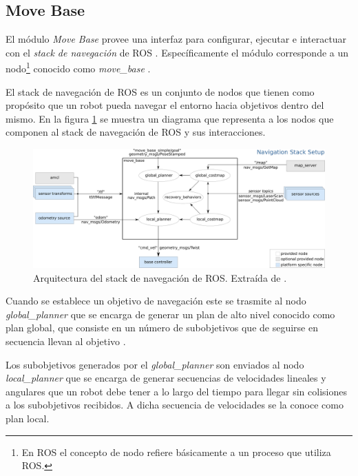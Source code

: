 \subsection{Move Base}\label{subsec:move_base}
El módulo \emph{Move Base} provee una interfaz para configurar, ejecutar e
interactuar con el \emph{stack de navegación} de \gls{ROS}
\cite{ROS-navigation}. Específicamente el módulo corresponde a un
nodo\footnote{En \gls{ROS} el concepto de nodo refiere básicamente a un proceso que
  utiliza ROS.} conocido como \emph{move\_base}
  \cite{ROS-move_base}. 

El stack de navegación de \gls{ROS} es un conjunto de nodos que tienen como propósito
que un robot pueda navegar el entorno hacia objetivos dentro del mismo. En la
figura \ref{fig:move_base} se muestra un diagrama que representa a los nodos que
componen al stack de navegación de \gls{ROS} y sus interacciones.

\begin{figure}[H]
  \center
  \includegraphics[width=1\linewidth]{imagenes/move_base.png}
  \caption[Arquitectura del stack de navegación de ROS.]{Arquitectura del stack de navegación de \gls{ROS}. Extraída de \cite{ROS-move_base}.}
  \label{fig:move_base}
\end{figure} 

Cuando se establece un objetivo de navegación este se trasmite al nodo
\emph{global\_planner} que se encarga de generar un plan de alto nivel
conocido como plan global, que consiste en un número de subobjetivos que de
seguirse en secuencia llevan al objetivo .

Los subobjetivos generados por el \emph{global\_planner} son enviados al nodo
\emph{local\_planner} que se encarga de generar secuencias de velocidades
lineales y angulares que un robot debe tener a lo largo del tiempo para llegar
sin colisiones a los subobjetivos recibidos. A dicha secuencia de velocidades
se la conoce como plan local.

